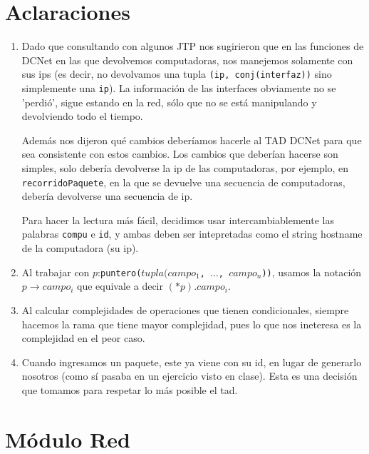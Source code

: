 \documentclass[a4paper,10pt, nofootinbib]{article}
\begin{document}
\maketitle
\thispagestyle{empty}

\section{Aclaraciones}
\begin{enumerate}
  \item Dado que consultando con algunos JTP nos sugirieron que en las funciones de DCNet en las que devolvemos computadoras, nos manejemos solamente con sus ips (es decir, no devolvamos una tupla \texttt{(ip, conj(interfaz))} sino simplemente una \texttt{ip}). La información de las interfaces obviamente no se 'perdió', sigue estando en la red, sólo que no se está manipulando y devolviendo todo el tiempo.
   
    Además nos dijeron qué cambios deberíamos hacerle al TAD DCNet para que sea consistente con estos cambios. Los cambios que deberían hacerse son simples, solo debería devolverse la ip de las computadoras, por ejemplo, en \texttt{recorridoPaquete}, en la que se devuelve una secuencia de computadoras, debería devolverse una secuencia de ip.
    
    Para hacer la lectura más fácil, decidimos usar intercambiablemente las palabras \texttt{compu} e \texttt{id}, y ambas deben ser intepretadas como el string hostname de la computadora (su ip).
    
    \item Al trabajar con $p$:\texttt{puntero($tupla(campo_1$, $\dots$, $campo_n$))}, usamos la notación $p\to campo_i$ que equivale a decir $(*p).campo_i$. 
    \item Al calcular complejidades de operaciones que tienen condicionales, siempre hacemos la rama que tiene mayor complejidad, pues lo que nos ineteresa es la complejidad en el peor caso. 
	\item Cuando ingresamos un paquete, este ya viene con su id, en lugar de generarlo nosotros (como sí pasaba en un ejercicio visto en clase). Esta es una decisión que tomamos para respetar lo más posible el tad. 

\end{enumerate}

\clearpage


\section{Módulo Red}

\clearpage
\end{document}
